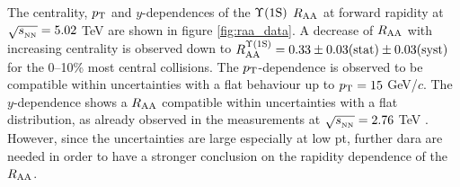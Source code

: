 The centrality, $p_{\rm T}$ and $y$-dependences of the $\mbox{$\Upsilon$(1S)}$ $\mbox{$R_{\rm{AA}}$}$ at forward rapidity at $\sqrt{s_{_{\rm NN}}}=5.02$ \rm{TeV} are shown in figure \ref{fig:raa_data}. 
A decrease of $\mbox{$R_{\rm{AA}}$}$ with increasing centrality is observed down to $R_{\rm{AA}}^{\Upsilon(\rm1S)}=0.33\pm0.03\text{(stat)}\pm0.03\text{(syst)}$  for the 0--10\% most central collisions.
The $p_{\rm T}$-dependence is observed to be compatible within uncertainties with a flat behaviour up to $p_{\rm T}=15$ GeV/$c$.
The $y$-dependence shows a $\mbox{$R_{\rm{AA}}$}$ compatible within uncertainties with a flat distribution, as already observed in the measurements at $\sqrt{s_{_{\rm NN}}}=2.76$ \rm{TeV} \cite{Abelev:2014nua}.
However, since the uncertainties are large especially at low pt, further dara are needed in order to have a stronger conclusion on the rapidity dependence of the $\mbox{$R_{\rm{AA}}$}$.

